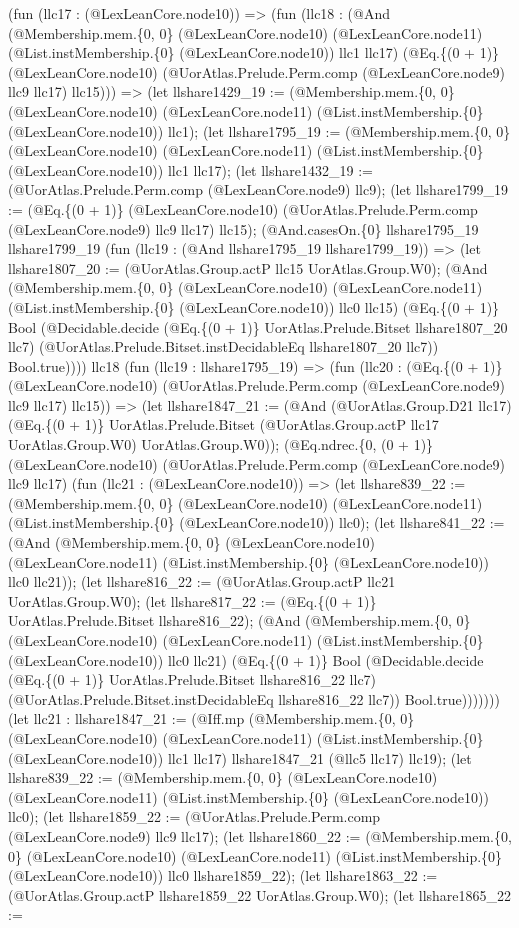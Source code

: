 \documentclass[11pt]{article}
\begin{document}
(fun (llc17 : (@LexLeanCore.node10)) => (fun (llc18 : (@And (@Membership.mem.\{0, 0\} (@LexLeanCore.node10) (@LexLeanCore.node11) (@List.instMembership.\{0\} (@LexLeanCore.node10)) llc1 llc17) (@Eq.\{(0 + 1)\} (@LexLeanCore.node10) (@UorAtlas.Prelude.Perm.comp (@LexLeanCore.node9) llc9 llc17) llc15))) => (let llshare1429\_19 := (@Membership.mem.\{0, 0\} (@LexLeanCore.node10) (@LexLeanCore.node11) (@List.instMembership.\{0\} (@LexLeanCore.node10)) llc1); (let llshare1795\_19 := (@Membership.mem.\{0, 0\} (@LexLeanCore.node10) (@LexLeanCore.node11) (@List.instMembership.\{0\} (@LexLeanCore.node10)) llc1 llc17); (let llshare1432\_19 := (@UorAtlas.Prelude.Perm.comp (@LexLeanCore.node9) llc9); (let llshare1799\_19 := (@Eq.\{(0 + 1)\} (@LexLeanCore.node10) (@UorAtlas.Prelude.Perm.comp (@LexLeanCore.node9) llc9 llc17) llc15); (@And.casesOn.\{0\} llshare1795\_19 llshare1799\_19 (fun (llc19 : (@And llshare1795\_19 llshare1799\_19)) => (let llshare1807\_20 := (@UorAtlas.Group.actP llc15 UorAtlas.Group.W0); (@And (@Membership.mem.\{0, 0\} (@LexLeanCore.node10) (@LexLeanCore.node11) (@List.instMembership.\{0\} (@LexLeanCore.node10)) llc0 llc15) (@Eq.\{(0 + 1)\} Bool (@Decidable.decide (@Eq.\{(0 + 1)\} UorAtlas.Prelude.Bitset llshare1807\_20 llc7) (@UorAtlas.Prelude.Bitset.instDecidableEq llshare1807\_20 llc7)) Bool.true)))) llc18 (fun (llc19 : llshare1795\_19) => (fun (llc20 : (@Eq.\{(0 + 1)\} (@LexLeanCore.node10) (@UorAtlas.Prelude.Perm.comp (@LexLeanCore.node9) llc9 llc17) llc15)) => (let llshare1847\_21 := (@And (@UorAtlas.Group.D21 llc17) (@Eq.\{(0 + 1)\} UorAtlas.Prelude.Bitset (@UorAtlas.Group.actP llc17 UorAtlas.Group.W0) UorAtlas.Group.W0)); (@Eq.ndrec.\{0, (0 + 1)\} (@LexLeanCore.node10) (@UorAtlas.Prelude.Perm.comp (@LexLeanCore.node9) llc9 llc17) (fun (llc21 : (@LexLeanCore.node10)) => (let llshare839\_22 := (@Membership.mem.\{0, 0\} (@LexLeanCore.node10) (@LexLeanCore.node11) (@List.instMembership.\{0\} (@LexLeanCore.node10)) llc0); (let llshare841\_22 := (@And (@Membership.mem.\{0, 0\} (@LexLeanCore.node10) (@LexLeanCore.node11) (@List.instMembership.\{0\} (@LexLeanCore.node10)) llc0 llc21)); (let llshare816\_22 := (@UorAtlas.Group.actP llc21 UorAtlas.Group.W0); (let llshare817\_22 := (@Eq.\{(0 + 1)\} UorAtlas.Prelude.Bitset llshare816\_22); (@And (@Membership.mem.\{0, 0\} (@LexLeanCore.node10) (@LexLeanCore.node11) (@List.instMembership.\{0\} (@LexLeanCore.node10)) llc0 llc21) (@Eq.\{(0 + 1)\} Bool (@Decidable.decide (@Eq.\{(0 + 1)\} UorAtlas.Prelude.Bitset llshare816\_22 llc7) (@UorAtlas.Prelude.Bitset.instDecidableEq llshare816\_22 llc7)) Bool.true))))))) (let llc21 : llshare1847\_21 := (@Iff.mp (@Membership.mem.\{0, 0\} (@LexLeanCore.node10) (@LexLeanCore.node11) (@List.instMembership.\{0\} (@LexLeanCore.node10)) llc1 llc17) llshare1847\_21 (@llc5 llc17) llc19); (let llshare839\_22 := (@Membership.mem.\{0, 0\} (@LexLeanCore.node10) (@LexLeanCore.node11) (@List.instMembership.\{0\} (@LexLeanCore.node10)) llc0); (let llshare1859\_22 := (@UorAtlas.Prelude.Perm.comp (@LexLeanCore.node9) llc9 llc17); (let llshare1860\_22 := (@Membership.mem.\{0, 0\} (@LexLeanCore.node10) (@LexLeanCore.node11) (@List.instMembership.\{0\} (@LexLeanCore.node10)) llc0 llshare1859\_22); (let llshare1863\_22 := (@UorAtlas.Group.actP llshare1859\_22 UorAtlas.Group.W0); (let llshare1865\_22 := 
\end{document}
